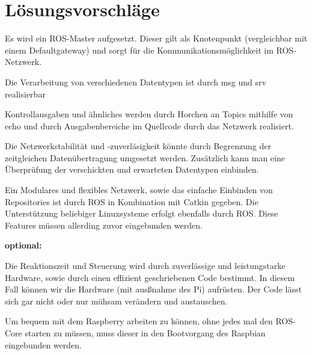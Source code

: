 \documentclass[12pt]{article}
\begin{document}
\section{Lösungsvorschläge}


Es wird ein ROS-Master aufgesetzt. Dieser gilt als Knotenpunkt (vergleichbar mit einem Defaultgateway) und sorgt für die Kommunikationsmöglichkeit im ROS-Netzwerk.

Die Verarbeitung von verschiedenen Datentypen ist durch msg und srv realisierbar

Kontrollausgaben und ähnliches werden durch Horchen an Topics mithilfe von echo und durch Ausgabenbereiche im Quellcode durch das Netzwerk realisiert.
 

Die Netzwerkstabilität und -zuverläsigkeit könnte durch Begrenzung der zeitgleichen Datenübertragung umgesetzt werden. Zusätzlich kann man eine Überprüfung der verschickten und erwarteten Datentypen einbinden.


Ein Modulares und flexibles Netzwerk, sowie das einfache Einbinden von Repositories ist durch ROS in Kombination mit Catkin gegeben. Die Unterstützung beliebiger Linuxsysteme erfolgt ebenfalls durch ROS. Diese Features müssen allerding zuvor eingebunden werden.


{\bf optional:}

Die Reaktionszeit 
und Steuerung %
wird durch zuverlässige und leistungstarke Hardware, sowie durch einen effizient geschriebenen Code bestimmt. In diesem Fall können wir die Hardware (mit ausßnahme des Pi) aufrüsten. Der Code lässt sich gar nicht oder nur mühsam verändern und austauschen.


Um bequem mit dem Raspberry arbeiten zu können, ohne jedes mal den ROS-Core starten zu müssen, muss dieser in den Bootvorgang des Raspbian eingebunden werden.


\end{document}
